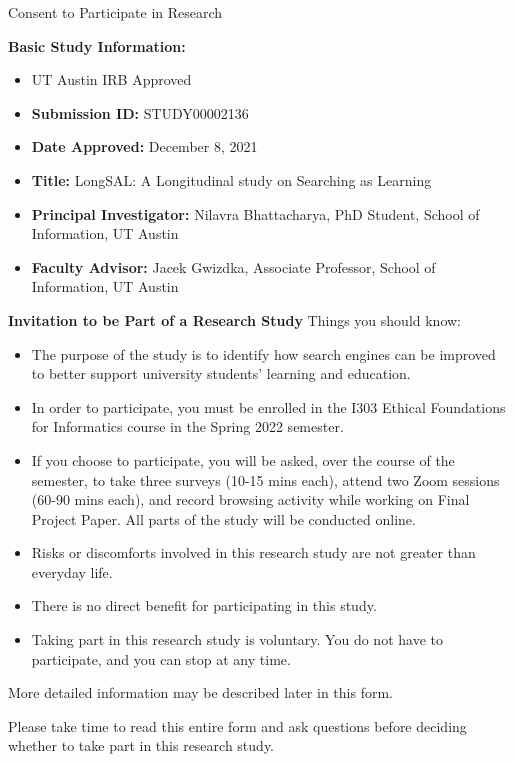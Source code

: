 \documentclass[letterpaper, nobind]{templates/ociamthesis}
\providecommand{\tightlist}{%
  \setlength{\itemsep}{0pt}\setlength{\parskip}{0pt}}
\begin{document}
Consent to Participate in Research

\textbf{Basic Study Information:}

\begin{itemize}
\tightlist
\item
  UT Austin IRB Approved
\item
  \textbf{Submission ID:} STUDY00002136
\item
  \textbf{Date Approved:} December 8, 2021
\item
  \textbf{Title:} LongSAL: A Longitudinal study on Searching as Learning
\item
  \textbf{Principal Investigator:} Nilavra Bhattacharya, PhD Student, School of Information, UT Austin
\item
  \textbf{Faculty Advisor:} Jacek Gwizdka, Associate Professor, School of Information, UT Austin
\end{itemize}

\textbf{Invitation to be Part of a Research Study}
Things you should know:

\begin{itemize}
\tightlist
\item
  The purpose of the study is to identify how search engines can be improved to better support university students' learning and education.
\item
  In order to participate, you must be enrolled in the I303 Ethical Foundations for Informatics course in the Spring 2022 semester.
\item
  If you choose to participate, you will be asked, over the course of the semester, to take three surveys (10-15 mins each), attend two Zoom sessions (60-90 mins each), and record browsing activity while working on Final Project Paper. All parts of the study will be conducted online.
\item
  Risks or discomforts involved in this research study are not greater than everyday life.
\item
  There is no direct benefit for participating in this study.
\item
  Taking part in this research study is voluntary. You do not have to participate, and you can stop at any time.
\end{itemize}

More detailed information may be described later in this form.

Please take time to read this entire form and ask questions before deciding whether to take part in this research study.
\end{document}
